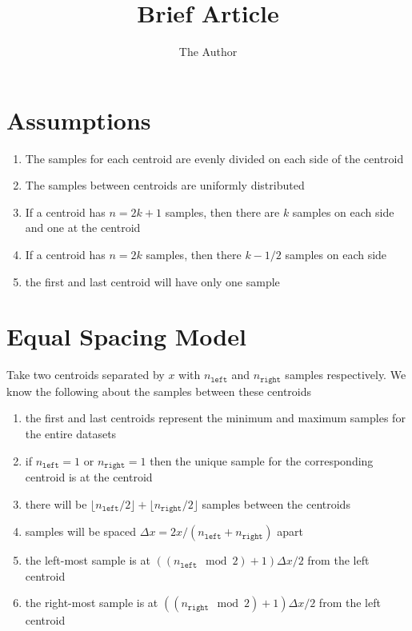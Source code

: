 \documentclass[11pt]{amsart}
\title{Brief Article}
\author{The Author}
\begin{document}
\maketitle
\section{Assumptions}
\begin{enumerate}
\item The samples for each centroid are evenly divided on each side of the centroid
\item The samples between centroids are uniformly distributed
\item If a centroid has $n = 2k + 1$ samples, then there are $k$ samples on each side and one at the centroid
\item If a centroid has $n = 2k$ samples, then there $k-1/2$ samples on each side
\item the first and last centroid will have only one sample
\end{enumerate}
\section{Equal Spacing Model}
Take two centroids separated by $x$ with $n_\mathtt{ left}$ and $n_\mathtt{ right}$ samples respectively. We know the following about the samples between these centroids
\begin{enumerate}
\item the first and last centroids represent the minimum and maximum samples for the entire datasets
\item if $n_\mathtt{left}=1$ or $n_\mathtt{right}=1$ then the unique sample for the corresponding centroid is at the centroid
\item there will be $\lfloor n_\mathtt{left} / 2 \rfloor + \lfloor n_\mathtt{right} / 2 \rfloor$ samples between the centroids
\item samples will be spaced $\Delta x = 2x / ( n_\mathtt {left} + n_\mathtt{ right})$ apart
\item the left-most sample is at $((n_\mathtt{left} \mod 2) + 1)\Delta x / 2$ from the left centroid
\item the right-most sample is at $((n_\mathtt{right} \mod 2) + 1)\Delta x / 2$ from the left centroid
\end{enumerate}
\end{document}
